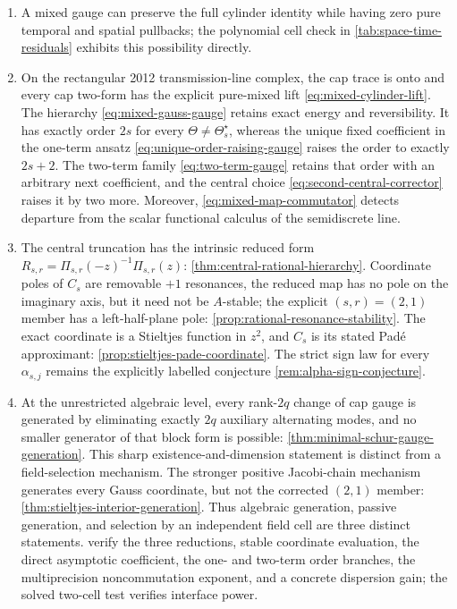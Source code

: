 \documentclass[11pt,a4paper]{article}
\begin{document}
\begin{enumerate}
  \item A mixed gauge can preserve the full cylinder identity while having
  zero pure temporal and spatial pullbacks; the polynomial cell check in
  \cref{tab:space-time-residuals} exhibits this possibility directly.
  \item On the rectangular 2012 transmission-line complex, the cap trace
  is onto and every cap two-form has the explicit pure-mixed lift
  \cref{eq:mixed-cylinder-lift}.  The hierarchy
  \cref{eq:mixed-gauss-gauge} retains exact energy and reversibility.  It
  has exactly order \(2s\) for every
  \(\Theta\ne\Theta_s^\star\), whereas the unique fixed coefficient in
  the one-term ansatz \cref{eq:unique-order-raising-gauge} raises the order
  to exactly \(2s+2\).  The two-term family
  \cref{eq:two-term-gauge} retains that order with an arbitrary next
  coefficient, and the central choice \cref{eq:second-central-corrector}
  raises it by two more.  Moreover,
  \cref{eq:mixed-map-commutator} detects departure
  from the scalar functional calculus of the semidiscrete line.
  \item The central truncation has the intrinsic reduced form
  \(R_{s,r}=\Pi_{s,r}(-z)^{-1}\Pi_{s,r}(z)\):
  \cref{thm:central-rational-hierarchy}.  Coordinate poles of \(C_s\)
  are removable \(+1\) resonances, the reduced map has no pole on the
  imaginary axis, but it need not be \(A\)-stable; the explicit
  \((s,r)=(2,1)\) member has a left-half-plane pole:
  \cref{prop:rational-resonance-stability}.  The exact coordinate is a
  Stieltjes function in \(z^2\), and \(C_s\) is its stated Pad\'e
  approximant: \cref{prop:stieltjes-pade-coordinate}.  The strict sign
  law for every \(\alpha_{s,j}\) remains the explicitly labelled
  conjecture \cref{rem:alpha-sign-conjecture}.
  \item At the unrestricted algebraic level, every rank-\(2q\) change of
  cap gauge is generated by eliminating exactly \(2q\) auxiliary
  alternating modes, and no smaller generator of that block form is
  possible: \cref{thm:minimal-schur-gauge-generation}.  This sharp
  existence-and-dimension statement is distinct from a field-selection
  mechanism.  The stronger positive
  Jacobi-chain mechanism generates every Gauss coordinate, but not the
  corrected \((2,1)\) member:
  \cref{thm:stieltjes-interior-generation}.  Thus algebraic generation,
  passive generation, and selection by an independent field cell are
  three distinct statements.
  verify the three reductions, stable coordinate evaluation, the direct
  asymptotic coefficient, the one- and two-term order branches, the
  multiprecision noncommutation exponent, and a
  concrete dispersion gain; the solved two-cell test verifies interface
  power.
\end{enumerate}
\end{document}
